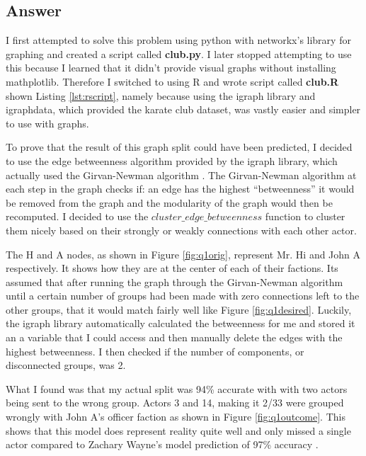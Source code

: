 \documentclass[letterpaper,11pt]{article}
\begin{document}
\clearpage
\subsection*{Answer}

I first attempted to solve this problem using python with networkx's library for graphing and created a script called \textbf{club.py}. I later stopped attempting to use this because I learned that it didn't provide visual graphs without installing mathplotlib. Therefore I switched to using R and wrote script called \textbf{club.R} shown Listing \ref{lst:rscript}, namely because using the igraph library and igraphdata, which provided the karate club dataset, was vastly easier and simpler to use with graphs.

To prove that the result of this graph split could have been predicted, I decided to use the edge betweenness algorithm provided by the igraph library, which actually used the Girvan-Newman algorithm \cite{commref}. The Girvan-Newman algorithm at each step in the graph checks if: an edge has the highest ``betweenness'' it would be removed from the graph and the modularity of the graph would then be recomputed. I decided to use the $cluster\_edge\_betweenness$ function to cluster them nicely based on their strongly or weakly connections with each other actor.

The H and A nodes, as shown in Figure \ref{fig:q1orig}, represent Mr. Hi and John A respectively. It shows how they are at the center of each of their factions. Its assumed that after running the graph through the Girvan-Newman algorithm until a certain number of groups had been made with zero connections left to the other groups, that it would match fairly well like Figure \ref{fig:q1desired}. Luckily, the igraph library automatically calculated the betweenness for me and stored it an a variable that I could access and then manually delete the edges with the highest betweenness. I then checked if the number of components, or disconnected groups, was 2. 

What I found was that my actual split was 94\% accurate with with two actors being sent to the wrong group. Actors 3 and 14, making it 2/33 were grouped wrongly with John A's officer faction as shown in Figure \ref{fig:q1outcome}. This shows that this model does represent reality quite well and only missed a single actor compared to Zachary Wayne's model prediction of 97\% accuracy \cite{zachref}.
\end{document}
